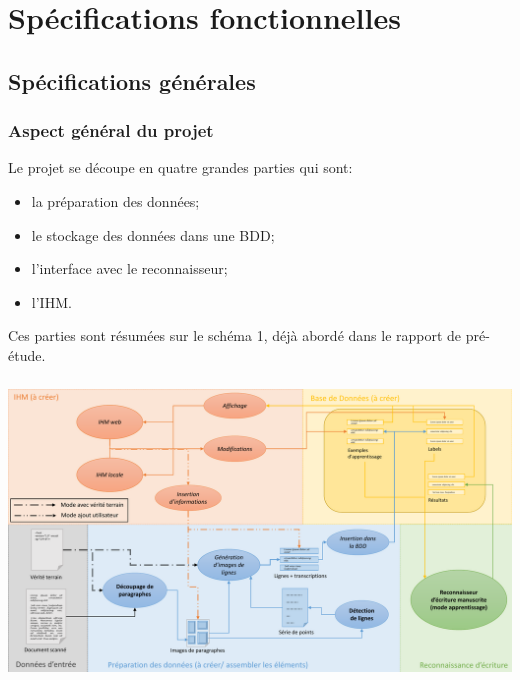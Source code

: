 \chapter{Spécifications fonctionnelles}

\section{Spécifications générales}

\subsection{Aspect général du projet}

Le projet se découpe en quatre grandes parties qui sont:

\begin{itemize}
	\item la préparation des données;
	\item le stockage des données dans une BDD;
	\item l'interface avec le reconnaisseur;
	\item l'IHM.
\end{itemize}

Ces parties sont résumées sur le schéma 1, déjà abordé dans le rapport de pré-étude.

\paragraph{}

\begin{mdframed}[frametitle={Figure 1 : Décomposition du projet (mode apprentissage)}, innerbottommargin=10]
\begin{center}
\includegraphics[width=\linewidth]{schema_mode1.1.pdf}
\end{center}
\end{mdframed}

